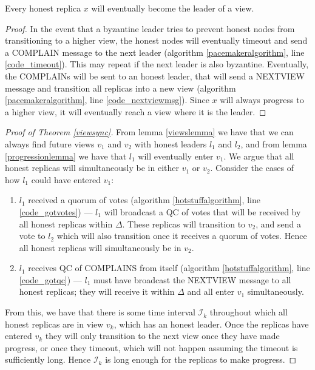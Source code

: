 \begin{lemma} \label{progressionlemma}
	Every honest replica $x$ will eventually become the leader of a view.
\end{lemma}

\begin{proof}
	In the event that a byzantine leader tries to prevent honest nodes from transitioning to a higher view, the honest nodes will eventually timeout and send a COMPLAIN message to the next leader (algorithm \ref{pacemakeralgorithm}, line \ref{code_timeout}). This may repeat if the next leader is also byzantine. Eventually, the COMPLAINs will be sent to an honest leader, that will send a NEXT{\large V}IEW message and transition all replicas into a new view (algorithm \ref{pacemakeralgorithm}, line \ref{code_nextviewmsg}). Since $x$ will always progress to a higher view, it will eventually reach a view where it is the leader.
\end{proof}

\begin{proof}[Proof of Theorem \ref{viewsync}]
	From lemma \ref{viewslemma} we have that we can always find future views $v_1$ and $v_2$ with honest leaders $l_1$ and $l_2$, and from lemma \ref{progressionlemma} we have that $l_1$ will eventually enter $v_1$. We argue that all honest replicas will simultaneously be in either $v_1$ or $v_2$. Consider the cases of how $l_1$ could have entered $v_1$:
	\begin{enumerate}
		\item $l_1$ received a quorum of votes (algorithm \ref{hotstuffalgorithm}, line \ref{code_gotvotes}) --- $l_1$ will broadcast a QC of votes that will be received by all honest replicas within $\Delta$. These replicas will transition to $v_2$, and send a vote to $l_2$ which will also transition once it receives a quorum of votes. Hence all honest replicas will simultaneously be in $v_2$.
		\item $l_1$ receives QC of COMPLAINS from itself (algorithm \ref{hotstuffalgorithm}, line \ref{code_gotqc}) --- $l_1$ must have broadcast the NEXT{\large V}IEW message to all honest replicas; they will receive it within $\Delta$ and all enter $v_1$ simultaneously.
	\end{enumerate}
	From this, we have that there is some time interval $\mathcal{I}_k$ throughout which all honest replicas are in view $v_k$, which has an honest leader. Once the replicas have entered $v_k$ they will only transition to the next view once they have made progress, or once they timeout, which will not happen assuming the timeout is sufficiently long. Hence $\mathcal{I}_k$ is long enough for the replicas to make progress.
\end{proof}

